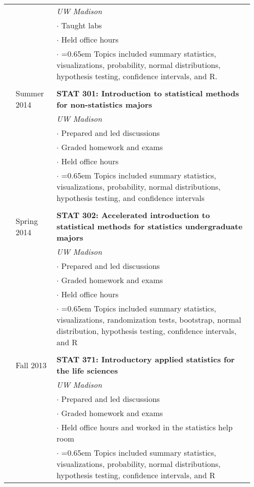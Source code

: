 \documentclass[10pt, oneside]{article}
\begin{document}
\begin{longtable}{p{1.4cm}p{2.1cm}p{13cm}}
& & \emph{UW Madison}\\
& & $\cdot$ Taught labs\\
& & $\cdot$ Held office hours\\
& & $\cdot$ \hangindent=0.65em \hangafter=1 Topics included summary statistics, visualizations, probability, normal distributions, hypothesis testing, confidence intervals, and R.\\
\\
& \hfill{Summer 2014} & \textbf{STAT 301: Introduction to statistical methods for non-statistics majors}\\
& & \emph{UW Madison}\\
& & $\cdot$ Prepared and led discussions\\
& & $\cdot$ Graded homework and exams\\
& & $\cdot$ Held office hours\\
& & $\cdot$ \hangindent=0.65em \hangafter=1 Topics included summary statistics, visualizations, probability, normal distributions, hypothesis testing, and confidence intervals\\
\\
& \hfill{Spring 2014} & \textbf{STAT 302: Accelerated introduction to statistical methods for statistics undergraduate majors}\\
& & \emph{UW Madison}\\
& & $\cdot$ Prepared and led discussions\\
& & $\cdot$ Graded homework and exams\\
& & $\cdot$ Held office hours\\
& & $\cdot$ \hangindent=0.65em \hangafter=1 Topics included summary statistics, visualizations, randomization tests, bootstrap, normal distribution, hypothesis testing, confidence intervals, and R\\
\\
& \hfill{Fall 2013} & \textbf{STAT 371: Introductory applied statistics for the life sciences}\\
& & \emph{UW Madison}\\
& & $\cdot$ Prepared and led discussions\\
& & $\cdot$ Graded homework and exams\\
& & $\cdot$ Held office hours and worked in the statistics help room\\
& & $\cdot$ \hangindent=0.65em \hangafter=1 Topics included summary statistics, visualizations, probability, normal distributions, hypothesis testing, confidence intervals, and R\\

\end{longtable}
\end{document}
